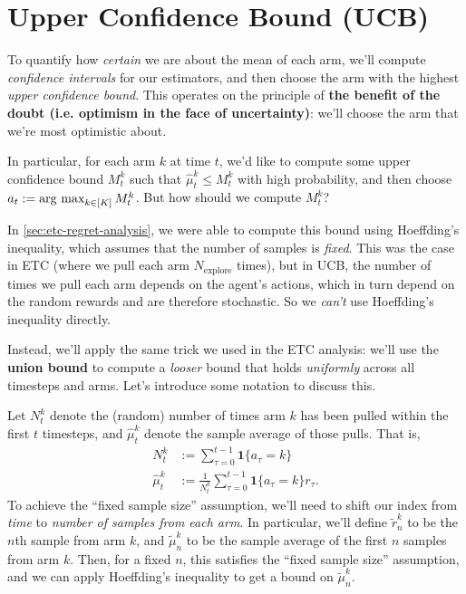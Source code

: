 \documentclass[\main/main]{subfiles}
\newcommand{\Nex}{N_{\text{explore}}}
\begin{document}
\section{Upper Confidence Bound (UCB)}

To quantify how \emph{certain} we are about the mean of each arm, we'll compute \emph{confidence intervals} for our estimators, and then choose the arm with the highest \emph{upper confidence bound}. This operates on the principle of \textbf{the benefit of the doubt (i.e. optimism in the face of uncertainty)}: we'll choose the arm that we're most optimistic about.

In particular, for each arm $k$ at time $t$, we'd like to compute some upper confidence bound $M^k_t$ such that $\hat \mu^k_t \le M^k_t$ with high probability, and then choose $a_t := \operatorname*{\textrm{arg\ max}}_{k \in [K]} M^k_t$. But how should we compute $M^k_t$?

In \autoref{sec:etc-regret-analysis}, we were able to compute this bound using Hoeffding's inequality, which assumes that the number of samples is \emph{fixed}. This was the case in ETC (where we pull each arm $\Nex$ times), but in UCB, the number of times we pull each arm depends on the agent's actions, which in turn depend on the random rewards and are therefore stochastic. So we \emph{can't} use Hoeffding's inequality directly.

Instead, we'll apply the same trick we used in the ETC analysis: we'll use the \textbf{union bound} to compute a \emph{looser} bound that holds \emph{uniformly} across all timesteps and arms. Let's introduce some notation to discuss this.

Let $N^k_t$ denote the (random) number of times arm $k$ has been pulled within the first $t$ timesteps, and $\hat \mu^k_t$ denote the sample average of those pulls. That is,
\begin{align*}
    N^k_t        & := \sum_{\tau=0}^{t-1} \mathbf{1} \{ a_\tau = k \}                         \\
    \hat \mu^k_t & := \frac{1}{N^k_t} \sum_{\tau=0}^{t-1} \mathbf{1} \{ a_\tau = k \} r_\tau.
\end{align*}
To achieve the ``fixed sample size'' assumption, we'll need to shift our index from \emph{time} to \emph{number of samples from each arm}. In particular, we'll define $\tilde r^k_n$ to be the $n$th sample from arm $k$, and $\tilde \mu^k_n$ to be the sample average of the first $n$ samples from arm $k$. Then, for a fixed $n$, this satisfies the ``fixed sample size'' assumption, and we can apply Hoeffding's inequality to get a bound on $\tilde \mu^k_n$.
\end{document}
